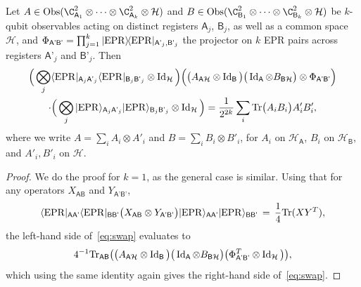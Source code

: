 \documentclass{toc}
\newcommand{\ket}[1]{|#1\rangle}
\newcommand{\bra}[1]{\langle#1|}
\newcommand{\proj}[1]{\ket{#1}\!\bra{#1}}
\newcommand{\Tr}{\mbox{\rm Tr}}
\newcommand{\Id}{\ensuremath{\mathop{\rm Id}\nolimits}}
\newcommand{\setft}[1]{\mathrm{#1}}
\newcommand{\Obs}{\setft{Obs}}
\newcommand{\reg}[1]{{\textsf{#1}}}
\newcommand{\mH}{\mathcal{H}}
\newcommand{\EPR}{{\rm EPR}}
\begin{document}
\begin{claim}\label{claim:swap-tt}
Let $A\in \Obs(\C^2_{\reg{A}_1}\otimes \cdots\otimes \C^2_{\reg{A}_k} \otimes \mH)$ and $B\in \Obs(\C^2_{\reg{B}_1}\otimes \cdots\otimes \C^2_{\reg{B}_k}\otimes \mH)$ be $k$-qubit observables acting on distinct registers $\reg{A}_j$, $\reg{B}_j$, as well as a common space $\mH$, and $\Phi_{\reg{A'B'}} = \prod_{j=1}^k \proj{\EPR}_{\reg{A'}_j,\reg{B'}_j}$ the projector on $k$ EPR pairs across registers $\reg{A'}_j$ and $\reg{B'}_j$.  Then 
\begin{multline}    %
%
 \Big(\bigotimes_j \bra{\EPR}_{\reg{A}_j\reg{A'}_j}\bra{\EPR}_{\reg{B}_j\reg{B'}_j} \otimes \Id_{\mH} \Big)\Big(\big(A_{\reg{A}\mH} \otimes \Id_\reg{B}\big)\big( \Id_\reg{A}\otimes B _{\reg{B}\mH}\big)\otimes \Phi_{\reg{A'B'}}\Big) \\
\cdot \Big(\bigotimes_j \ket{\EPR}_{\reg{A}_j\reg{A'}_j}\ket{\EPR}_{\reg{B}_j\reg{B'}_j} \otimes \Id_\mH\Big) = \frac{1}{2^{2k}}\sum_i \Tr\big(A_i B_i\big) A'_iB'_i,\label{eq:swap}
\end{multline}
where we write $A = \sum_i A_i \otimes A'_i$ and $B=\sum_i B_i\otimes B'_i$, for $A_i$ on $\mH_\reg{A}$, $B_i$ on $\mH_{\reg{B}}$, and $A'_i,B'_i$ on $\mH$.
\end{claim}


\begin{proof}
We do the proof for $k=1$, as the general case is similar. Using that for any operators $X_{\reg{AB}} $ and $ Y_{\reg{A'B'}}$, 
$$\bra{\EPR}_{\reg{AA'}}\bra{\EPR}_{\reg{BB'}} \big( X_{\reg{AB}} \otimes Y_{\reg{A'B'}} \big) \ket{\EPR}_{\reg{AA'}}\ket{\EPR}_{\reg{BB'}} \,=\, \frac{1}{4}\Tr(XY^T),$$
the left-hand side of~\eqref{eq:swap} evaluates to 
$$4^{-1} \Tr_{\reg{AB}}\big( \big(A_{\reg{A}\mH} \otimes \Id_\reg{B}\big)\big( \Id_\reg{A}\otimes B _{\reg{B}\mH}\big)\big(\Phi_{\reg{A'B'}}^T\otimes \Id_\mH\big)\big),$$
 which using the same identity again 
gives the right-hand side of~\eqref{eq:swap}.
\end{proof} %
\end{document}
